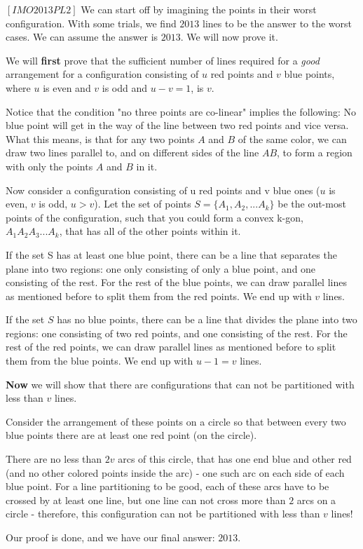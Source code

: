 \begin{problem}
$[IMO2013PL2]$
We can start off by imagining the points in their worst configuration. With some trials, we find $2013$ lines to be the answer to the worst cases. We can assume the answer is $2013$. We will now prove it.


We will \textbf{first} prove that the sufficient number of lines required for a \textit{good} arrangement for a configuration consisting of $u$ red points and $v$ blue points, where $u$ is even and $v$ is odd and $u - v = 1$, is $v$.

Notice that the condition "no three points are co-linear" implies the following: No blue point will get in the way of the line between two red points and vice versa. What this means, is that for any two points $A$ and $B$ of the same color, we can draw two lines parallel to, and on different sides of the line $AB$, to form a region with only the points $A$ and $B$ in it.

Now consider a configuration consisting of u red points and v blue ones ($u$ is even, $v$ is odd, $u>v$). Let the set of points $S = \{A_1, A_2, ... A_k\}$ be the out-most points of the configuration, such that you could form a convex k-gon, $A_1 A_2 A_3 ... A_k$, that has all of the other points within it.

If the set S has at least one blue point, there can be a line that separates the plane into two regions: one only consisting of only a blue point, and one consisting of the rest. For the rest of the blue points, we can draw parallel lines as mentioned before to split them from the red points. We end up with $v$ lines.

If the set $S$ has no blue points, there can be a line that divides the plane into two regions: one consisting of two red points, and one consisting of the rest. For the rest of the red points, we can draw parallel lines as mentioned before to split them from the blue points. We end up with $u-1 = v$ lines.

\textbf{Now} we will show that there are configurations that can not be partitioned with less than $v$ lines.

Consider the arrangement of these points on a circle so that between every two blue points there are at least one red point (on the circle).

There are no less than $2v$ arcs of this circle, that has one end blue and other red (and no other colored points inside the arc) - one such arc on each side of each blue point. For a line partitioning to be good, each of these arcs have to be crossed by at least one line, but one line can not cross more than $2$ arcs on a circle - therefore, this configuration can not be partitioned with less than $v$ lines!

Our proof is done, and we have our final answer: $2013$.

\end{problem}


